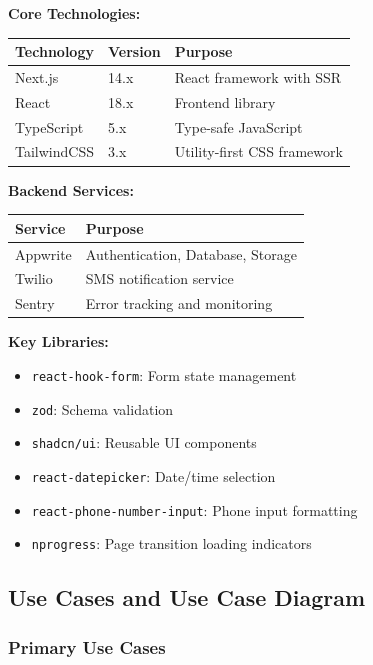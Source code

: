 \documentclass[11pt,a4paper]{article}
\begin{document}
\textbf{Core Technologies:}
\begin{table}[H]
\begin{tabular}{|l|l|l|}
\hline
\textbf{Technology} & \textbf{Version} & \textbf{Purpose} \\
\hline
Next.js & 14.x & React framework with SSR \\
React & 18.x & Frontend library \\
TypeScript & 5.x & Type-safe JavaScript \\
TailwindCSS & 3.x & Utility-first CSS framework \\
\hline
\end{tabular}
\end{table}

\textbf{Backend Services:}
\begin{table}[H]
\begin{tabular}{|l|l|}
\hline
\textbf{Service} & \textbf{Purpose} \\
\hline
Appwrite & Authentication, Database, Storage \\
Twilio & SMS notification service \\
Sentry & Error tracking and monitoring \\
\hline
\end{tabular}
\end{table}

\textbf{Key Libraries:}
\begin{itemize}
    \item \texttt{react-hook-form}: Form state management
    \item \texttt{zod}: Schema validation
    \item \texttt{shadcn/ui}: Reusable UI components
    \item \texttt{react-datepicker}: Date/time selection
    \item \texttt{react-phone-number-input}: Phone input formatting
    \item \texttt{nprogress}: Page transition loading indicators
\end{itemize}

\subsection{Use Cases and Use Case Diagram}

\subsubsection{Primary Use Cases}
\end{document}
